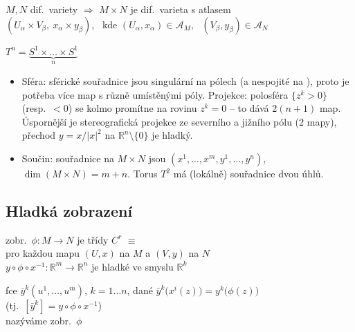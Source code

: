 \begin{priklad}
$M, N$ dif.\ variety $\Rightarrow$ $M\times N$ je dif.\ varieta s atlasem \\
\quad $(U_\alpha\times V_\beta,\ x_\alpha\times y_\beta)$, \ kde $(U_\alpha,x_\alpha)\in\mathcal{A}_M$, \ $(V_\beta,y_\beta)\in\mathcal{A}_N$

$T^n = \underbrace{S^1\times\dots\times S^1}_{n}$ \quad {}
\end{priklad}

\begin{vysvetleni}[K příkladům]
\begin{itemize}[nosep]
  \item Sféra: sférické souřadnice jsou singulární na pólech (a nespojité na ), proto je potřeba více map s různě umístěnými póly. Projekce: polosféra $\{z^k>0\}$ (resp.\ $<0$) se kolmo promítne na rovinu $z^k=0$ -- to dává $2(n+1)$ map. Úspornější je stereografická projekce ze severního a jižního pólu (2 mapy), přechod $y = x/|x|^2$ na $\mathbb{R}^n\setminus\{0\}$ je hladký.
  \item Součin: souřadnice na $M\times N$ jsou $(x^1,\dots,x^m,y^1,\dots,y^n)$, $\dim(M\times N)=m+n$. Torus $T^2$ má (lokálně) souřadnice dvou úhlů.
\end{itemize}
\end{vysvetleni}

\subsection{Hladká zobrazení}

\begin{definice}
zobr.\ $\phi: M\to N$ je třídy $C^r$ $\equiv$ \\
\quad pro každou mapu $(U,x)$ na $M$ a $(V,y)$ na $N$ \\
\quad $y\circ\phi\circ x^{-1}: \mathbb{R}^m\to\mathbb{R}^n$ je hladké ve smyslu $\mathbb{R}^k$

fce $\bar y^k(u^1,\dots,u^m)$, $k = 1\dots n$, dané $\bar y^k\big(x^i(z)\big) = y^k\big(\phi(z)\big)$ \\
\quad (tj.\ $[\bar y^k] = y\circ\phi\circ x^{-1}$) \\
nazýváme  zobr.\ $\phi$
\end{definice}


